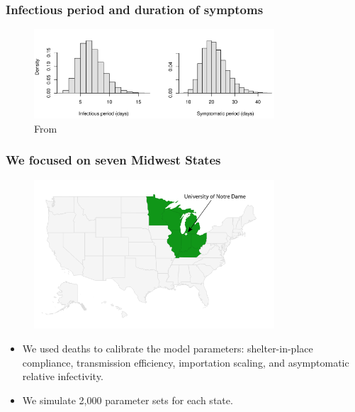 \documentclass[usenames,dvipsnames]{beamer}
\begin{document}
\begin{frame}
  \frametitle{Infectious period and duration of symptoms}
  \begin{figure}
    \includegraphics[width=0.8\textwidth]{./figures/manuscript_figure_parameter_periods.png}
    \caption{From \citep{He2020_Nature, Lauer2020_Annals,Bi2020_LancetID}}
  \end{figure}

\end{frame}

\begin{frame}
  \frametitle{We focused on seven Midwest States}
   \begin{figure}
    \includegraphics[width=0.8\textwidth]{./images/FRED_midwest_states_sim.png}
  \end{figure}

  \begin{itemize}
  \item We used deaths to calibrate the model parameters: shelter-in-place compliance, transmission efficiency, importation scaling, and asymptomatic relative infectivity.
  \item We simulate 2,000 parameter sets for each state.
  \end{itemize}    
\end{frame}
\end{document}
